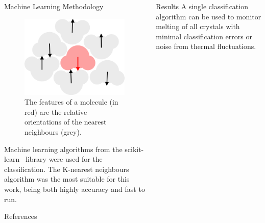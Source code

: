\documentclass{beamer}
\begin{document}
\begin{frame}[t]{}
\begin{columns}[t]
\begin{column}{0.47\linewidth}
\begin{block}{Machine Learning Methodology}
      \begin{figure}[h]
        \centering
        \includegraphics[width=0.67\linewidth]{orientations}
        \caption{The features of a molecule (in red) are the relative orientations of the nearest
        neighbours (grey).}
        \label{fig:orientations}
      \end{figure}

      Machine learning algorithms from the scikit-learn~\autocite{scikit-learn} library
      were used for the classification. The K-nearest neighbours algorithm was the most
      suitable for this work, being both highly accuracy and fast to run.

    \end{block}

    \begin{block}{References}
      \printbibliography
      \vspace{0.5em}
    \end{block}

    \end{column}
    \begin{column}{0.47\linewidth}
      \begin{block}{Results}
        A single classification algorithm can be used to monitor melting of all crystals
        with minimal classification errors or noise from thermal fluctuations.


\end{block}
\end{column}
\end{columns}
\end{frame}
\end{document}
